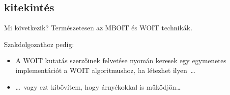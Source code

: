 \documentclass{beamer}
\begin{document}
\subsection{kitekintés}
\begin{frame}{Mi következik?}
		Természetesen az MBOIT és WOIT technikák.
		
		Szakdolgozathoz pedig:
	\begin{itemize}
		\item A WOIT kutatás szerzőinek felvetése nyomán keresek egy egymenetes implementációt a WOIT algoritmushoz, ha létezhet ilyen~\dots
		\item \dots~vagy ezt kibővítem, hogy árnyékokkal is működjön\dots
	\end{itemize}
\end{frame}
\begin{frame}
	\huge {}
\end{frame}
\end{document}
